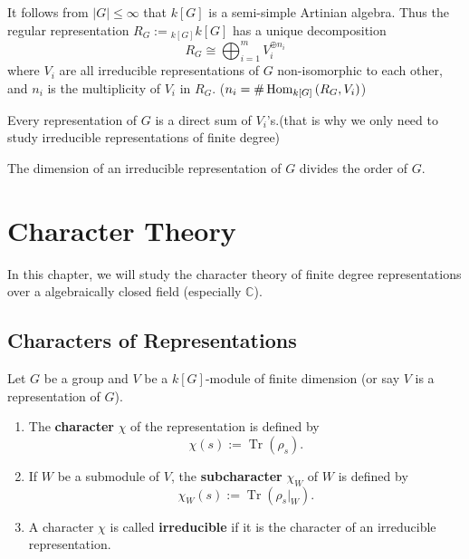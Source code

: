 \documentclass[12pt, oneside]{book}
\begin{document}
\begin{corollary}
    It follows from $\left|G\right|\leq \infty$ that $k[G]$ is a semi-simple Artinian algebra. Thus the regular representation $R_G:={}_{k[G]} k[G]$ has a unique decomposition
    \begin{equation*}
        R_G\cong \bigoplus_{i=1}^m V_i^{\oplus n_i}
    \end{equation*}
    where $V_i$ are all irreducible representations of $G$ non-isomorphic to each other, and $n_i$ is the multiplicity of $V_i$ in $R_G$. ($n_i=\# \operatorname{\operatorname{Hom}}_{k[G]}\left( R_G,V_i \right)$)

    Every representation of $G$ is a direct sum of $V_i$'s.(that is why we only need to study irreducible representations of finite degree)
\end{corollary}


\begin{corollary}
    The dimension of an irreducible representation of $G$ divides the order of $G$.
\end{corollary}





\chapter{Character Theory}
In this chapter, we will study the character theory of finite degree representations over a algebraically closed field (especially $\mathbb{C}$).

\section{Characters of Representations}
\begin{definition}
    Let $G$ be a group and $V$ be a $k[G]$-module of finite dimension (or say $V$ is a representation of $G$).
    \begin{enumerate}
        \item
              The \textbf{character} $\chi$ of the representation is defined by
              \begin{equation*}
                  \chi(s)
                  :=
                  \operatorname{Tr}\left(\rho_s\right) .
              \end{equation*}
        \item
              If $W$ be a submodule of $V$, the \textbf{subcharacter} $\chi_{W}$ of $W$ is defined by
              \begin{equation*}
                  \chi_{W}(s)
                  :=
                  \operatorname{Tr}\left(\rho_s|_{W}\right) .
              \end{equation*}
        \item
              A character $\chi$ is called \textbf{irreducible} if it is the character of an irreducible representation.
    \end{enumerate}
\end{definition}
\end{document}
